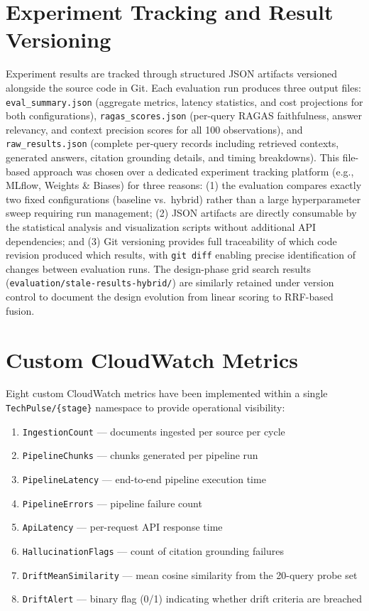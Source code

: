 \section{Experiment Tracking and Result Versioning}
\label{sec:experiment_tracking}

Experiment results are tracked through structured JSON artifacts versioned alongside the source code in Git. Each evaluation run produces three output files: \texttt{eval\_summary.json} (aggregate metrics, latency statistics, and cost projections for both configurations), \texttt{ragas\_scores.json} (per-query RAGAS faithfulness, answer relevancy, and context precision scores for all 100 observations), and \texttt{raw\_results.json} (complete per-query records including retrieved contexts, generated answers, citation grounding details, and timing breakdowns). This file-based approach was chosen over a dedicated experiment tracking platform (e.g., MLflow, Weights \& Biases) for three reasons: (1) the evaluation compares exactly two fixed configurations (baseline vs.\ hybrid) rather than a large hyperparameter sweep requiring run management; (2) JSON artifacts are directly consumable by the statistical analysis and visualization scripts without additional API dependencies; and (3) Git versioning provides full traceability of which code revision produced which results, with \texttt{git diff} enabling precise identification of changes between evaluation runs. The design-phase grid search results (\texttt{evaluation/stale-results-hybrid/}) are similarly retained under version control to document the design evolution from linear scoring to RRF-based fusion.

\section{Custom CloudWatch Metrics}
\label{sec:metrics}

Eight custom CloudWatch metrics have been implemented within a single \texttt{TechPulse/\{stage\}} namespace to provide operational visibility:

\begin{enumerate}[leftmargin=0.5in]
  \item \texttt{IngestionCount} --- documents ingested per source per cycle
  \item \texttt{PipelineChunks} --- chunks generated per pipeline run
  \item \texttt{PipelineLatency} --- end-to-end pipeline execution time
  \item \texttt{PipelineErrors} --- pipeline failure count
  \item \texttt{ApiLatency} --- per-request API response time
  \item \texttt{HallucinationFlags} --- count of citation grounding failures
  \item \texttt{DriftMeanSimilarity} --- mean cosine similarity from the 20-query probe set
  \item \texttt{DriftAlert} --- binary flag (0/1) indicating whether drift criteria are breached
\end{enumerate}

